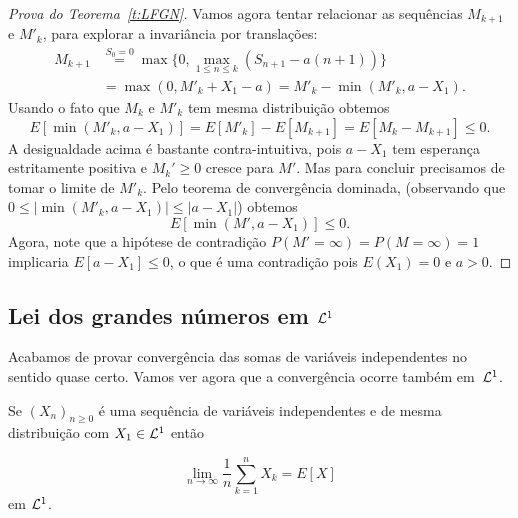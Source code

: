 \begin{proof}[Prova do Teorema~\ref{t:LFGN}]
\medskip

Vamos agora tentar relacionar as sequências $M_{k + 1}$ e $M'_k$, para explorar a invariância por translações:
\begin{equation*}
  \begin{split}
    M_{k+1}
    & \overset{S_0 = 0}= \max \Big\{
      0, \max_{1 \leq n \leq k} (S_{n + 1} - a(n + 1))
      \Big\}\\
    & = \max(0, M'_k + X_1 - a) = M'_k - \min(M'_k, a - X_1).
  \end{split}
\end{equation*}
Usando o fato que $M_k$ e $M'_k$ tem mesma distribuição obtemos
\begin{equation}
  E[\min(M'_k,a-X_1)]=E[M'_{k}]-E[M_{k+1}]=E[M_{k}-M_{k+1}]\le 0.
\end{equation}
A desigualdade acima é bastante contra-intuitiva, pois $a - X_1$ tem esperança estritamente positiva e $M_k' \geq 0$ cresce para $M'$.
Mas para concluir precisamos de tomar o limite de $M'_k$.
Pelo teorema de convergência dominada, (observando que $0 \le |\min(M'_k, a - X_1)| \le |a - X_1|$) obtemos
$$E[\min(M',a-X_1)]\le 0.$$
Agora, note que a hipótese de contradição $P(M'=\infty)=P(M=\infty)=1$ implicaria
$E[a-X_1]\le 0$,
o que é uma contradição pois $E(X_1) = 0$ e $a > 0$.
\end{proof}








\subsection{Lei dos grandes números em ${\mathcal L}^1$}

Acabamos de provar convergência das somas de variáveis independentes no sentido quase certo.
Vamos ver agora que a convergência ocorre também em~${\mathcal L}^1$.

\begin{theorem}
 Se $(X_n)_{n\ge 0}$ é uma sequência de variáveis independentes e de mesma distribuição com $X_1\in {\ensuremath{\mathcal L}}^1$ então

 $$ \lim_{n\to \infty} \frac{1}{n}\sum_{k=1}^n X_k=E[X] $$
 em ${\mathcal L}^1$.
\end{theorem}


